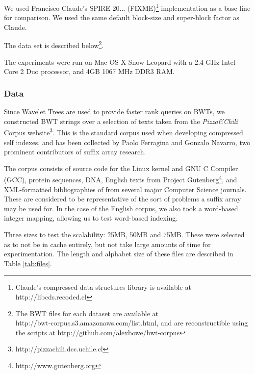 We used Francisco Claude's SPIRE 20... (FIXME)\footnote{Claude's compressed data 
structures library is available at http://libcds.recoded.cl} implementation as a 
base line for comparison. We used the same default block-size and 
super-block factor as Claude.

The data set is described below\footnote{The BWT files for each dataset are 
available at\\ http://bwt-corpus.s3.amazonaws.com/list.html, and are 
reconstructible using the scripts at http://github.com/alexbowe/bwt-corpus}.

The experiments were run on Mac OS X Snow Leopard with a 2.4 GHz Intel Core 2
Duo processor, and 4GB 1067 MHz DDR3 RAM.

\subsubsection{Data}
Since Wavelet Trees are used to provide faster rank queries on BWTs, we
constructed BWT strings over a selection of texts taken from the \emph{Pizza\&Chili}
Corpus website\footnote{http://pizzachili.dcc.uchile.cl}. This is the standard
corpus used when developing compressed self indexes, and has been collected by
Paolo Ferragina and Gonzalo Navarro, two prominent contributors of suffix array 
research.

The corpus consists of source code for the Linux kernel and GNU C Compiler
(GCC), protein sequences, DNA, English texts from Project
Gutenberg\footnote{http://www.gutenberg.org}, and XML-formatted bibliographies
of from several major Computer Science journals. These are considered to be
representative of the sort of problems a suffix array may be used for. In the 
case of the English corpus, we also took a word-based integer mapping, allowing 
us to test word-based indexing.

Three sizes to test the scalability: 25MB, 50MB and 75MB. These were selected as 
to not be in cache entirely, but not take large amounts of time
for experimentation. The length and alphabet size of these files are described 
in Table \ref{tab:files}.

